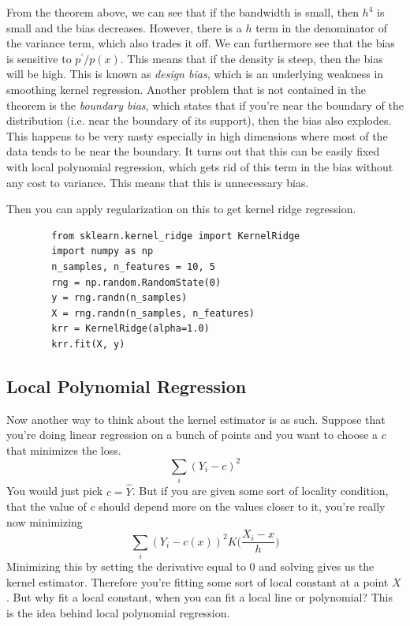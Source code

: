     From the theorem above, we can see that if the bandwidth is small, then $h^4$ is small and the bias decreases. However, there is a $h$ term in the denominator of the variance term, which also trades it off. We can furthermore see that the bias is sensitive to $p^\prime / p(x)$. This means that if the density is steep, then the bias will be high. This is known as \textit{design bias}, which is an underlying weakness in smoothing kernel regression. Another problem that is not contained in the theorem is the \textit{boundary bias}, which states that if you're near the boundary of the distribution (i.e. near the boundary of its support), then the bias also explodes. This happens to be very nasty especially in high dimensions where most of the data tends to be near the boundary. It turns out that this can be easily fixed with local polynomial regression, which gets rid of this term in the bias without any cost to variance. This means that this is unnecessary bias. 

    Then you can apply regularization on this to get kernel ridge regression. 

    \begin{code}
      \begin{lstlisting}
        from sklearn.kernel_ridge import KernelRidge
        import numpy as np
        n_samples, n_features = 10, 5
        rng = np.random.RandomState(0)
        y = rng.randn(n_samples)
        X = rng.randn(n_samples, n_features)
        krr = KernelRidge(alpha=1.0)
        krr.fit(X, y)
      \end{lstlisting}
    \end{code}

  \subsection{Local Polynomial Regression}

    Now another way to think about the kernel estimator is as such. Suppose that you're doing linear regression on a bunch of points and you want to choose a $c$ that minimizes the loss. 
    \begin{equation}
      \sum_i (Y_i - c)^2
    \end{equation}
    You would just pick $c = \hat{Y}$. But if you are given some sort of locality condition, that the value of $c$ should depend more on the values closer to it, you're really now minimizing 
    \begin{equation}
      \sum_i (Y_i - c(x))^2 K \bigg( \frac{X_i - x}{h} \bigg)
    \end{equation}
    Minimizing this by setting the derivative equal to $0$ and solving gives us the kernel estimator. Therefore you're fitting some sort of local constant at a point $X$. But why fit a local constant, when you can fit a local line or polynomial? This is the idea behind local polynomial regression.

